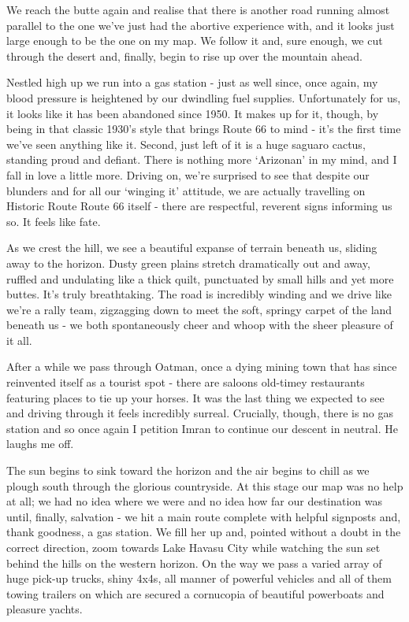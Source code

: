 \documentclass[a5paper,10pt,titlepage,draft]{book}
\begin{document}
We reach the butte again and realise that there is another road running almost parallel to the one we've just had the abortive experience with, and it looks just large enough to be the one on my map.  We follow it and, sure enough, we cut through the desert and, finally, begin to rise up over the mountain ahead.

Nestled high up we run into a gas station - just as well since, once again, my blood pressure is heightened by our dwindling fuel supplies.  Unfortunately for us, it looks like it has been abandoned since 1950.  It makes up for it, though, by being in that classic 1930's style that brings Route 66 to mind - it's the first time we've seen anything like it.  Second, just left of it is a huge saguaro cactus, standing proud and defiant.  There is nothing more `Arizonan' in my mind, and I fall in love a little more.  Driving on, we're surprised to see that despite our blunders and for all our `winging it' attitude, we are actually travelling on Historic Route Route 66 itself - there are respectful, reverent signs informing us so.  It feels like fate.

As we crest the hill, we see a beautiful expanse of terrain beneath us, sliding away to the horizon.  Dusty green plains stretch dramatically out and away, ruffled and undulating like a thick quilt, punctuated by small hills and yet more buttes.  It's truly breathtaking.  The road is incredibly winding and we drive like we're a rally team, zigzagging down to meet the soft, springy carpet of the land beneath us - we both spontaneously cheer and whoop with the sheer pleasure of it all.

After a while we pass through Oatman, once a dying mining town that has since reinvented itself as a tourist spot - there are saloons old-timey restaurants featuring places to tie up your horses.  It was the last thing we expected to see and driving through it feels incredibly surreal.  Crucially, though, there is no gas station and so once again I petition Imran to continue our descent in neutral.  He laughs me off.

The sun begins to sink toward the horizon and the air begins to chill as we plough south through the glorious countryside.  At this stage our map was no help at all; we had no idea where we were and no idea how far our destination was until, finally, salvation - we hit a main route complete with helpful signposts and, thank goodness, a gas station.  We fill her up and, pointed without a doubt in the correct direction, zoom towards Lake Havasu City while watching the sun set behind the hills on the western horizon.  On the way we pass a varied array of huge pick-up trucks, shiny 4x4s, all manner of powerful vehicles and all of them towing trailers on which are secured a cornucopia of beautiful powerboats and pleasure yachts.
\end{document}
